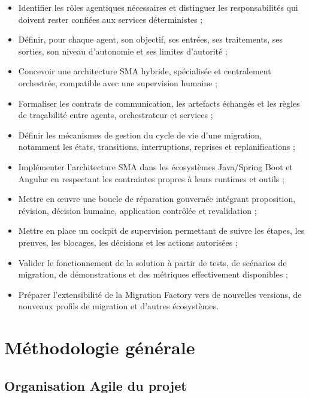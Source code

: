 \begin{itemize}
    \item Identifier les rôles agentiques nécessaires et distinguer les responsabilités qui doivent rester confiées aux services déterministes ;
    \item Définir, pour chaque agent, son objectif, ses entrées, ses traitements, ses sorties, son niveau d'autonomie et ses limites d'autorité ;
    \item Concevoir une architecture SMA hybride, spécialisée et centralement orchestrée, compatible avec une supervision humaine ;
    \item Formaliser les contrats de communication, les artefacts échangés et les règles de traçabilité entre agents, orchestrateur et services ;
    \item Définir les mécanismes de gestion du cycle de vie d'une migration, notamment les états, transitions, interruptions, reprises et replanifications ;
    \item Implémenter l'architecture SMA dans les écosystèmes Java/Spring Boot et Angular en respectant les contraintes propres à leurs runtimes et outils ;
    \item Mettre en œuvre une boucle de réparation gouvernée intégrant proposition, révision, décision humaine, application contrôlée et revalidation ;
    \item Mettre en place un cockpit de supervision permettant de suivre les étapes, les preuves, les blocages, les décisions et les actions autorisées ;
    \item Valider le fonctionnement de la solution à partir de tests, de scénarios de migration, de démonstrations et des métriques effectivement disponibles ;
    \item Préparer l'extensibilité de la Migration Factory vers de nouvelles versions, de nouveaux profils de migration et d'autres écosystèmes.
\end{itemize}

\section{Méthodologie générale}

\subsection{Organisation Agile du projet}

